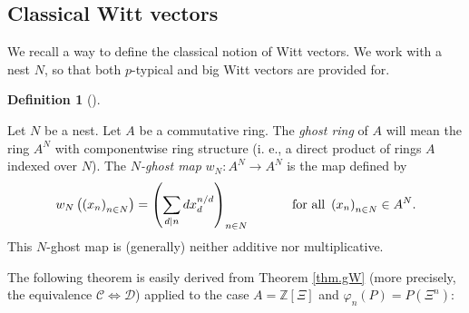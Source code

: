 \documentclass[numbers=enddot,12pt,final,onecolumn,notitlepage]{scrartcl}%
\theoremstyle{definition}
\newtheorem{defi}[theo]{Definition}
\newenvironment{definition}[1][]
{\begin{defi}[#1]\begin{leftbar}}
{\end{leftbar}\end{defi}}
\let\sumnonlimits\sum
\renewcommand{\sum}{\sumnonlimits\limits}
\begin{document}
\subsection{Classical Witt vectors}

We recall a way to define the classical notion of Witt vectors. We work with a
nest $N$, so that both $p$-typical and big Witt vectors are provided for.

\begin{definition}
\label{def.Witt.ghostmap}Let $N$ be a nest. Let $A$ be a commutative ring. The
\textit{ghost ring} of $A$ will mean the ring $A^{N}$ with componentwise ring
structure (i. e., a direct product of rings $A$ indexed over $N$). The
$N$\textit{-ghost map} $w_{N}:A^{N}\rightarrow A^{N}$ is the map defined by%
\[
w_{N}\left(  \left(  x_{n}\right)  _{n\in N}\right)  =\left(  \sum
\limits_{d\mid n}dx_{d}^{n / d}\right)  _{n\in N}\ \ \ \ \ \ \ \ \ \ \text{for
all }\left(  x_{n}\right)  _{n\in N}\in A^{N}.
\]
This $N$-ghost map is (generally) neither additive nor multiplicative.
\end{definition}

The following theorem is easily derived from Theorem \ref{thm.gW} (more
precisely, the equivalence $\mathcal{C}\Longleftrightarrow\mathcal{D}$)
applied to the case $A=\mathbb{Z}\left[  \Xi\right]  $ and $\varphi_{n}\left(
P\right)  =P\left(  \Xi^{n}\right)  $:
\end{document}
